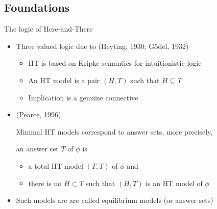 \subsection{Foundations}
\begin{frame}[label=foundations]{The logic of Here-and-There}
  \begin{itemize}
  \item<1->%
    \medskip

    Three valued logic due to  (Heyting, 1930; Gödel, 1932)

    \begin{itemize}\normalsize
    \item HT is based on Kripke semantics for intuitionistic logic
      \smallskip
    \item An HT model is a pair $(H,T)$ such that $H\subseteq T$
      \smallskip
    \item Implication is a genuine connective
    \end{itemize}
  \item<4->  (Pearce, 1996)%
    \medskip

    Minimal HT models correspond to answer sets\pause[5], more precisely,

    an answer set $T$ of $\phi$ is
    \begin{itemize}\normalsize
    \item a total HT model $(T,T)$ of $\phi$ and
    \item there is no $H\subset T$ such that $(H,T)$ is an HT model of $\phi$
    \end{itemize}

  \item<6-> Such models are are called \alert<6->{equilibrium models} (or answer sets)
  \end{itemize}
\end{frame}
